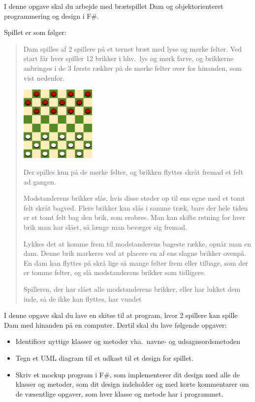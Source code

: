 I denne opgave skal du arbejde med brætspillet Dam og objektorienteret programmering og design i F\#.

Spillet er som følger:
\begin{quote}
  Dam spilles af 2 spillere på et ternet bræt med lyse og mørke felter. Ved start får hver spiller 12 brikker i hhv.\ lys og mørk farve, og brikkerne anbringes i de 3 første rækker på de mørke felter over for hinanden, som vist nedenfor.
  \begin{center}
    \includegraphics[width=0.3\textwidth]{145px-Draughts}
  \end{center}
  Der spilles kun på de mørke felter, og brikken flyttes skråt fremad et felt ad gangen.

  Modstanderens brikker slås, hvis disse støder op til ens egne med et tomt felt skråt bagved. Flere brikker kan slås i samme træk, bare der hele tiden er et tomt felt bag den brik, som erobres. Man kan skifte retning for hver brik man har slået, så længe man bevæger sig fremad.

  Lykkes det at komme frem til modstanderens bageste række, opnår man en dam. Denne brik markeres ved at placere en af ens slagne brikker ovenpå. En dam kan flyttes på skrå lige så mange felter frem eller tilbage, som der er tomme felter, og slå modstanderens brikker som tidligere.

  Spilleren, der har slået alle modstanderens brikker, eller har lukket dem inde, så de ikke kan flyttes, har vundet
\end{quote}

I denne opgave skal du lave en skitse til at program, hvor 2 spillere kan spille Dam med hinanden på en computer. Dertil skal du lave følgende opgaver:
\begin{itemize}
\item Identificer nyttige klasser og metoder vha.\ navne- og udsagnsordsmetoden
\item Tegn et UML diagram til et udkast til et design for spillet.
\item Skriv et mockup program i F\#, som implementerer dit design med alle de klasser og metoder, som dit design indeholder og med korte kommentarer om de væsentlige opgaver, som hver klasse og metode har i programmet.  
\end{itemize}
